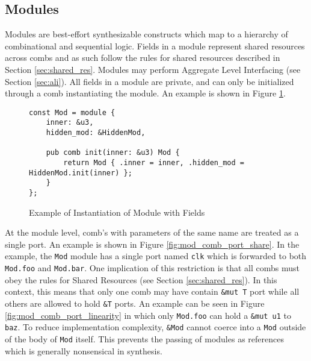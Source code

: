 \documentclass[10pt]{article}
\begin{document}
\subsection{Modules}\label{sec:modules}
Modules are best-effort synthesizable constructs which map to a hierarchy of combinational and
sequential logic. Fields in a module represent shared resources across combs and as such follow the
rules for shared resources described in Section \ref{sec:shared_res}. Modules may perform Aggregate
Level Interfacing (see Section \ref{sec:ali}). All fields in a module are private, and can only be
initialized through a comb instantiating the module. An example is shown in Figure
\ref{fig:mod_fields_inst}.
\begin{figure}[H]
	\begin{verbatim}
const Mod = module {
    inner: &u3,
    hidden_mod: &HiddenMod,

    pub comb init(inner: &u3) Mod {
        return Mod { .inner = inner, .hidden_mod = HiddenMod.init(inner) };
    }
};
	\end{verbatim}
	\vspace*{-5mm}
	\caption{Example of Instantiation of Module with Fields}
	\label{fig:mod_fields_inst}
\end{figure}

At the module level, comb's with parameters of the same name are treated as a single port. An example
is shown in Figure \ref{fig:mod_comb_port_share}. In the example, the \verb|Mod| module has a single
port named \verb|clk| which is forwarded to both \verb|Mod.foo| and \verb|Mod.bar|. One implication
of this restriction is that all combs must obey the rules for Shared Resources (see Section
\ref{sec:shared_res}). In this context, this means that only one comb may have contain \verb|&mut T|
port while all others are allowed to hold \verb|&T| ports. An example can be seen in Figure
\ref{fig:mod_comb_port_linearity} in which only \verb|Mod.foo| can hold a \verb|&mut u1| to
\verb|baz|. To reduce implementation complexity, \verb|&Mod| cannot coerce into a \verb|Mod| outside
of the body of \verb|Mod| itself. This prevents the passing of modules as references which is
generally nonsensical in synthesis.
\end{document}
